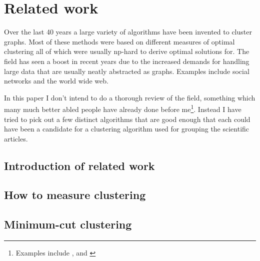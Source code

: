\section{Related work}

Over the last 40 years a large variety of algorithms have been invented 
to cluster graphs. Most of these methods were based on different 
measures of optimal clustering all of which were usually np-hard to 
derive optimal solutions for. The field has seen a boost in recent years 
due to the increased demands for handling large data that are usually 
neatly abstracted as graphs\cite[p. 2]{fortunato2010}. Examples include 
social networks and the world wide web.

In this paper I don't intend to do a thorough review of the field, 
something which many much better abled people have already done before 
me\footnote{Examples include \cite{newman2004}, \cite{schaeffer2007} and 
\cite{fortunato2010}}. Instead I have tried to pick out a few distinct 
algorithms that are good enough that each could have been a candidate 
for a clustering algorithm used for grouping the scientific articles.



\subsection{Introduction of related work} %

\subsection{How to measure clustering}

\subsection{Minimum-cut clustering}

